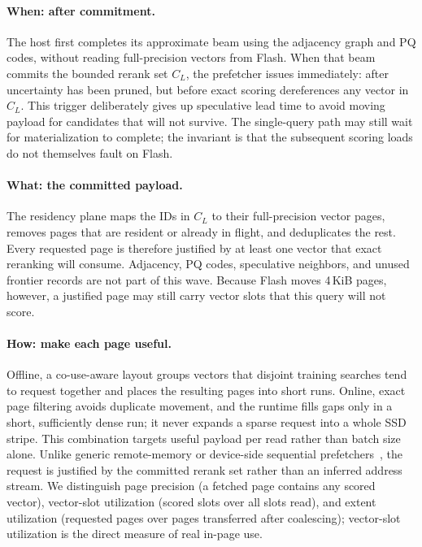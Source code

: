 \paragraph{When: after commitment.}
The host first completes its approximate beam using the adjacency graph and PQ codes, without reading full-precision vectors from Flash.
When that beam commits the bounded rerank set $C_L$, the prefetcher issues immediately: after uncertainty has been pruned, but before exact scoring dereferences any vector in $C_L$.
This trigger deliberately gives up speculative lead time to avoid moving payload for candidates that will not survive.
The single-query path may still wait for materialization to complete; the invariant is that the subsequent scoring loads do not themselves fault on Flash.

\paragraph{What: the committed payload.}
The residency plane maps the IDs in $C_L$ to their full-precision vector pages, removes pages that are resident or already in flight, and deduplicates the rest.
Every requested page is therefore justified by at least one vector that exact reranking will consume.
Adjacency, PQ codes, speculative neighbors, and unused frontier records are not part of this wave.
Because Flash moves 4\,KiB pages, however, a justified page may still carry vector slots that this query will not score.

\paragraph{How: make each page useful.}
Offline, a co-use-aware layout groups vectors that disjoint training searches tend to request together and places the resulting pages into short runs.
Online, exact page filtering avoids duplicate movement, and the runtime fills gaps only in a short, sufficiently dense run; it never expands a sparse request into a whole SSD stripe.
This combination targets useful payload per read rather than batch size alone.
Unlike generic remote-memory or device-side sequential prefetchers~\cite{leap,cacheinhand}, the request is justified by the committed rerank set rather than an inferred address stream.
We distinguish page precision (a fetched page contains any scored vector), vector-slot utilization (scored slots over all slots read), and extent utilization (requested pages over pages transferred after coalescing); vector-slot utilization is the direct measure of real in-page use.

